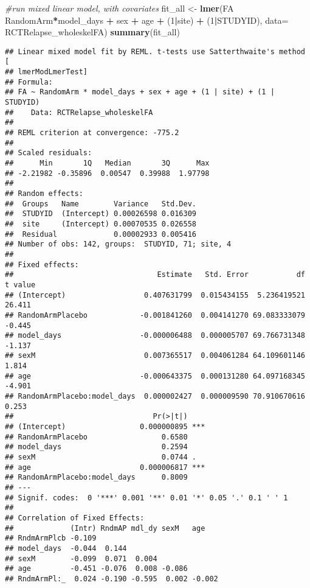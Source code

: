 \documentclass[]{article}
\newenvironment{Shaded}{\begin{snugshade}}{\end{snugshade}}
\newcommand{\KeywordTok}[1]{\textcolor[rgb]{0.13,0.29,0.53}{\textbf{#1}}}
\newcommand{\DataTypeTok}[1]{\textcolor[rgb]{0.13,0.29,0.53}{#1}}
\newcommand{\DecValTok}[1]{\textcolor[rgb]{0.00,0.00,0.81}{#1}}
\newcommand{\StringTok}[1]{\textcolor[rgb]{0.31,0.60,0.02}{#1}}
\newcommand{\CommentTok}[1]{\textcolor[rgb]{0.56,0.35,0.01}{\textit{#1}}}
\newcommand{\OperatorTok}[1]{\textcolor[rgb]{0.81,0.36,0.00}{\textbf{#1}}}
\newcommand{\NormalTok}[1]{#1}
\theoremstyle{definition}
\theoremstyle{definition}
\theoremstyle{definition}
\theoremstyle{remark}
\begin{document}
\begin{Shaded}
\begin{Highlighting}[]
\CommentTok{#run mixed linear model, with covariates}
\NormalTok{fit_all <-}\StringTok{ }\KeywordTok{lmer}\NormalTok{(FA }\OperatorTok{~}\StringTok{ }\NormalTok{RandomArm}\OperatorTok{*}\NormalTok{model_days }\OperatorTok{+}\StringTok{ }\NormalTok{sex }\OperatorTok{+}\StringTok{ }\NormalTok{age }\OperatorTok{+}\StringTok{ }\NormalTok{(}\DecValTok{1}\OperatorTok{|}\NormalTok{site) }\OperatorTok{+}\StringTok{ }\NormalTok{(}\DecValTok{1}\OperatorTok{|}\NormalTok{STUDYID), }\DataTypeTok{data=}\NormalTok{ RCTRelapse_wholeskelFA)}
\KeywordTok{summary}\NormalTok{(fit_all)}
\end{Highlighting}
\end{Shaded}

\begin{verbatim}
## Linear mixed model fit by REML. t-tests use Satterthwaite's method [
## lmerModLmerTest]
## Formula: 
## FA ~ RandomArm * model_days + sex + age + (1 | site) + (1 | STUDYID)
##    Data: RCTRelapse_wholeskelFA
## 
## REML criterion at convergence: -775.2
## 
## Scaled residuals: 
##      Min       1Q   Median       3Q      Max 
## -2.21982 -0.35896  0.00547  0.39988  1.97798 
## 
## Random effects:
##  Groups   Name        Variance   Std.Dev.
##  STUDYID  (Intercept) 0.00026598 0.016309
##  site     (Intercept) 0.00070535 0.026558
##  Residual             0.00002933 0.005416
## Number of obs: 142, groups:  STUDYID, 71; site, 4
## 
## Fixed effects:
##                                 Estimate   Std. Error           df t value
## (Intercept)                  0.407631799  0.015434155  5.236419521  26.411
## RandomArmPlacebo            -0.001841260  0.004141270 69.083333079  -0.445
## model_days                  -0.000006488  0.000005707 69.766731348  -1.137
## sexM                         0.007365517  0.004061284 64.109601146   1.814
## age                         -0.000643375  0.000131280 64.097168345  -4.901
## RandomArmPlacebo:model_days  0.000002427  0.000009590 70.910670616   0.253
##                                Pr(>|t|)    
## (Intercept)                 0.000000895 ***
## RandomArmPlacebo                 0.6580    
## model_days                       0.2594    
## sexM                             0.0744 .  
## age                         0.000006817 ***
## RandomArmPlacebo:model_days      0.8009    
## ---
## Signif. codes:  0 '***' 0.001 '**' 0.01 '*' 0.05 '.' 0.1 ' ' 1
## 
## Correlation of Fixed Effects:
##             (Intr) RndmAP mdl_dy sexM   age   
## RndmArmPlcb -0.109                            
## model_days  -0.044  0.144                     
## sexM        -0.099  0.071  0.004              
## age         -0.451 -0.076  0.008 -0.086       
## RndmArmPl:_  0.024 -0.190 -0.595  0.002 -0.002
\end{verbatim}
\end{document}
